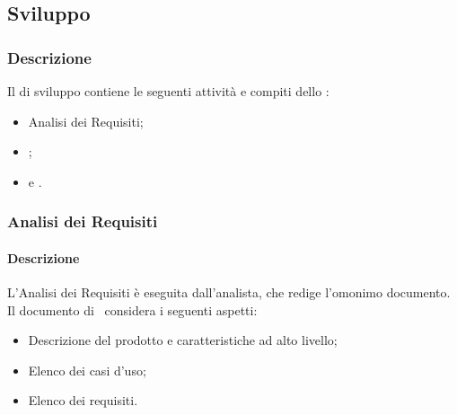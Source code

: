 \subsection{Sviluppo}\label{sviluppo}

\subsubsection{Descrizione}
Il  di sviluppo contiene le seguenti attività e compiti dello :
\begin{itemize}
  \item Analisi dei Requisiti;
  \item {};
  \item {} e .
\end{itemize}

\subsubsection{Analisi dei Requisiti}\label{analisi-requisiti}
\paragraph{Descrizione}
L'Analisi dei Requisiti è eseguita dall'analista, che redige l'omonimo documento. Il documento di \AdR\ considera i seguenti aspetti:
\begin{itemize}
  \item Descrizione del prodotto e caratteristiche ad alto livello;
  \item Elenco dei casi d'uso;
  \item Elenco dei requisiti.
\end{itemize}

